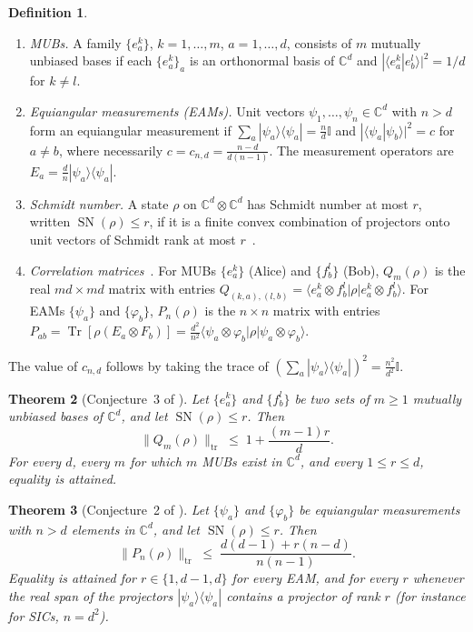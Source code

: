 \documentclass[11pt]{amsart}
\newtheorem{theorem}{Theorem}
\theoremstyle{definition}
\newtheorem{definition}[theorem]{Definition}
\theoremstyle{remark}
\newcommand{\C}{\mathbb{C}}
\newcommand{\Tr}{\operatorname{Tr}}
\newcommand{\SN}{\operatorname{SN}}
\newcommand{\one}{\mathbb{I}}
\newcommand{\tr}{\mathrm{tr}}
\newcommand{\ket}[1]{|#1\rangle}
\newcommand{\bra}[1]{\langle #1|}
\begin{document}
\begin{definition}
\begin{enumerate}
\item \emph{MUBs.} A family $\{e^k_a\}$, $k=1,\dots,m$, $a=1,\dots,d$, consists of $m$ mutually unbiased bases if
each $\{e^k_a\}_a$ is an orthonormal basis of $\C^d$ and $|\langle e^k_a|e^l_b\rangle|^2=1/d$ for $k\neq l$.
\item \emph{Equiangular measurements (EAMs).} Unit vectors $\psi_1,\dots,\psi_n\in\C^d$ with $n>d$ form an
equiangular measurement if $\sum_a\ket{\psi_a}\bra{\psi_a}=\frac nd\one$ and
$|\langle\psi_a|\psi_b\rangle|^2=c$ for $a\neq b$, where necessarily $c=c_{n,d}=\frac{n-d}{d(n-1)}$. The
measurement operators are $E_a=\frac dn\ket{\psi_a}\bra{\psi_a}$.
\item \emph{Schmidt number.} A state $\rho$ on $\C^d\otimes\C^d$ has Schmidt number at most $r$, written
$\SN(\rho)\le r$, if it is a finite convex combination of projectors onto unit vectors of Schmidt rank at most
$r$~\cite{TerhalHorodecki2000}.
\item \emph{Correlation matrices}~\cite{TavakoliMorelli2024}. For MUBs $\{e^k_a\}$ (Alice) and $\{f^l_b\}$ (Bob),
$Q_m(\rho)$ is the real $md\times md$ matrix with entries
$Q_{(k,a),(l,b)}=\bra{e^k_a\otimes f^l_b}\rho\ket{e^k_a\otimes f^l_b}$. For EAMs $\{\psi_a\}$ and $\{\varphi_b\}$,
$P_n(\rho)$ is the $n\times n$ matrix with entries
$P_{ab}=\Tr[\rho(E_a\otimes F_b)]=\frac{d^2}{n^2}\bra{\psi_a\otimes\varphi_b}\rho\ket{\psi_a\otimes\varphi_b}$.
\end{enumerate}
\end{definition}

The value of $c_{n,d}$ follows by taking the trace of $(\sum_a\ket{\psi_a}\bra{\psi_a})^2=\frac{n^2}{d^2}\one$.

\begin{theorem}[Conjecture~3 of \cite{TavakoliMorelli2024}]\label{thm:mub}
Let $\{e^k_a\}$ and $\{f^l_b\}$ be two sets of $m\ge1$ mutually unbiased bases of $\C^d$, and let
$\SN(\rho)\le r$. Then
\[
\|Q_m(\rho)\|_{\tr}\;\le\;1+\frac{(m-1)r}{d}.
\]
For every $d$, every $m$ for which $m$ MUBs exist in $\C^d$, and every $1\le r\le d$, equality is attained.
\end{theorem}

\begin{theorem}[Conjecture~2 of \cite{TavakoliMorelli2024}]\label{thm:eam}
Let $\{\psi_a\}$ and $\{\varphi_b\}$ be equiangular measurements with $n>d$ elements in $\C^d$, and let
$\SN(\rho)\le r$. Then
\[
\|P_n(\rho)\|_{\tr}\;\le\;\frac{d(d-1)+r(n-d)}{n(n-1)}.
\]
Equality is attained for $r\in\{1,d-1,d\}$ for every EAM, and for every $r$ whenever the real span of the
projectors $\ket{\psi_a}\bra{\psi_a}$ contains a projector of rank $r$ (for instance for SICs, $n=d^2$).
\end{theorem}
\end{document}
